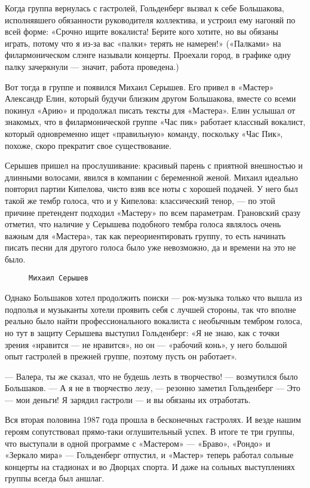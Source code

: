 Когда группа вернулась с гастролей, Гольденберг вызвал к себе Большакова, исполнявшего обязанности руководителя
коллектива, и устроил ему нагоняй по всей форме: «Срочно ищите вокалиста! Берите кого хотите, но вы обязаны играть,
потому что я из-за вас «палки» терять не намерен!» («Палками» на филармоническом слэнге называли концерты. Проехали
город, в графике одну палку зачеркнули — значит, работа проведена.)

Вот тогда в группе и появился Михаил Серышев. Его привел в «Мастер» Александр Елин, который будучи близким другом
Большакова, вместе со всеми покинул «Арию» и продолжал писать тексты для «Мастера». Елин услышал от знакомых, что в
филармонической группе «Час пик» работает классный вокалист, который одновременно ищет «правильную» команду, поскольку
«Час Пик», похоже, скоро прекратит свое существование.

Серышев пришел на прослушивание: красивый парень с приятной внешностью и длинными волосами, явился в компании с
беременной женой. Михаил идеально повторил партии Кипелова, чисто взяв все ноты с хорошей подачей. У него был такой же
тембр голоса, что и у Кипелова: классический тенор, — по этой причине претендент подходил «Мастеру» по всем параметрам.
Грановский сразу отметил, что наличие у Серышева подобного тембра голоса являлось очень важным для «Мастера», так как
переориентировать группу, то есть начинать писать песни для другого голоса было уже невозможно, да и времени на это не
было.

\begin{wrapfigure}{R}{0.5\textwidth}
    \centering
    \caption{\texttt{Михаил Серышев}}
\end{wrapfigure}

Однако Большаков хотел продолжить поиски — рок-музыка только что вышла из подполья и музыканты хотели проявить себя с
лучшей стороны, так что вполне реально было найти профессионального вокалиста с необычным тембром голоса, но тут в
защиту Серышева выступил Гольденберг: «Я не знаю, как с точки зрения «нравится — не нравится», но он — «рабочий конь», у
него большой опыт гастролей в прежней группе, поэтому пусть он работает».

— Валера, ты же сказал, что не будешь лезть в творчество! — возмутился было Большаков.
— А я не в творчество лезу, — резонно заметил Гольденберг — Это — мои деньги! Я зарядил гастроли — и вы обязаны их
отработать.

Вся вторая половина 1987 года прошла в бесконечных гастролях. И везде нашим героям сопутствовал прямо-таки оглушительный
успех. В итоге те три группы, что выступали в одной программе с «Мастером» — «Браво», «Рондо» и «Зеркало мира» —
Гольденберг отпустил, и «Мастер» теперь работал сольные концерты на стадионах и во Дворцах спорта. И даже на сольных
выступлениях группы всегда был аншлаг.

